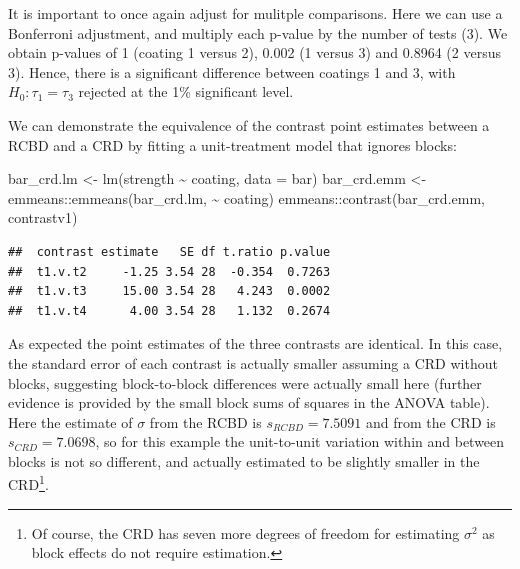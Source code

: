 \documentclass[
]{book}
\newenvironment{Shaded}{\begin{snugshade}}{\end{snugshade}}
\newcommand{\AttributeTok}[1]{\textcolor[rgb]{0.77,0.63,0.00}{#1}}
\newcommand{\DecValTok}[1]{\textcolor[rgb]{0.00,0.00,0.81}{#1}}
\newcommand{\FunctionTok}[1]{\textcolor[rgb]{0.00,0.00,0.00}{#1}}
\newcommand{\NormalTok}[1]{#1}
\newcommand{\OtherTok}[1]{\textcolor[rgb]{0.56,0.35,0.01}{#1}}
\newcommand{\SpecialCharTok}[1]{\textcolor[rgb]{0.00,0.00,0.00}{#1}}
\newcommand{\StringTok}[1]{\textcolor[rgb]{0.31,0.60,0.02}{#1}}
\theoremstyle{definition}
\theoremstyle{definition}
\theoremstyle{definition}
\theoremstyle{definition}
\theoremstyle{remark}
\begin{document}
It is important to once again adjust for mulitple comparisons. Here we can use a Bonferroni adjustment, and multiply each p-value by the number of tests (3). We obtain p-values of 1 (coating 1 versus 2), 0.002 (1 versus 3) and 0.8964 (2 versus 3). Hence, there is a significant difference between coatings 1 and 3, with \(H_0: \tau_1 = \tau_3\) rejected at the 1\% significant level.

We can demonstrate the equivalence of the contrast point estimates between a RCBD and a CRD by fitting a unit-treatment model that ignores blocks:

\begin{Shaded}
\begin{Highlighting}[]
\NormalTok{bar\_crd.lm }\OtherTok{\textless{}{-}} \FunctionTok{lm}\NormalTok{(strength }\SpecialCharTok{\textasciitilde{}}\NormalTok{ coating, }\AttributeTok{data =}\NormalTok{ bar)}
\NormalTok{bar\_crd.emm }\OtherTok{\textless{}{-}}\NormalTok{ emmeans}\SpecialCharTok{::}\FunctionTok{emmeans}\NormalTok{(bar\_crd.lm, }\SpecialCharTok{\textasciitilde{}}\NormalTok{ coating)}
\NormalTok{emmeans}\SpecialCharTok{::}\FunctionTok{contrast}\NormalTok{(bar\_crd.emm, }\StringTok{\textquotesingle{}contrastv1\textquotesingle{}}\NormalTok{)}
\end{Highlighting}
\end{Shaded}

\begin{verbatim}
##  contrast estimate   SE df t.ratio p.value
##  t1.v.t2     -1.25 3.54 28  -0.354  0.7263
##  t1.v.t3     15.00 3.54 28   4.243  0.0002
##  t1.v.t4      4.00 3.54 28   1.132  0.2674
\end{verbatim}

\begin{Shaded}
\end{Shaded}

As expected the point estimates of the three contrasts are identical. In this case, the standard error of each contrast is actually smaller assuming a CRD without blocks, suggesting block-to-block differences were actually small here (further evidence is provided by the small block sums of squares in the ANOVA table). Here the estimate of \(\sigma\) from the RCBD is \(s_{RCBD} = 7.5091\) and from the CRD is \(s_{CRD} = 7.0698\), so for this example the unit-to-unit variation within and between blocks is not so different, and actually estimated to be slightly smaller in the CRD\footnote{Of course, the CRD has seven more degrees of freedom for estimating \(\sigma^2\) as block effects do not require estimation.}.
\end{document}
